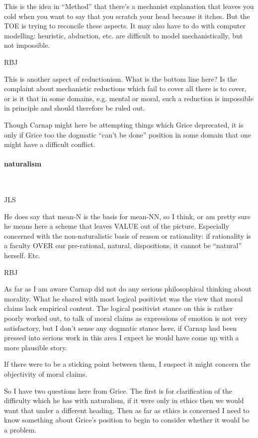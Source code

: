 \documentclass[10pt,titlepage]{book}
\begin{document}
This is the idea in ``Method'' that there's a mechanist  
explanation that leaves you cold when you want to say that you scratch your head  
because it itches. But the TOE is trying to reconcile these aspects. It may 
also  have to do with computer modelling: heuristic, abduction, etc. are 
difficult to  model mechanistically, but not impossible.
 
RBJ

This is another aspect of reductionism.
What is the bottom line here?
Is the complaint about mechanistic reductions which fail to cover all there is to cover, or is it that in some domains, e.g. mental or moral, such a reduction is impossible in principle and should therefore be ruled out.

Though Carnap might here be attempting things which Grice deprecated, it is only if Grice too the dogmatic ``can't be done'' position in some domain that one might have a difficult conflict.
 
\paragraph{naturalism}\ 

JLS

He does say that mean-N is the basis for mean-NN, so I think,  
or am pretty sure he means here a scheme that leaves VALUE out of the 
picture.  Especially concerned with the non-naturalistic basis of reason or 
rationality:  if rationality is a faculty OVER our pre-rational, natural, 
dispositions, it  cannot be ``natural'' herself. Etc. 

RBJ

As far as I am aware Carnap did not do any serious philosophical thinking about morality.
What he shared with most logical positivist was the view that moral claims lack empirical content.
The logical positivist stance on this is rather poorly worked out, to talk of moral claims as expressions of emotion is not very satisfactory, but I don't sense any dogmatic stance here, if Carnap had been pressed into serious work in this area I expect he would have come up with a more plausible story.

If there were to be a sticking point between them, I suspect it might concern the objectivity of moral claims.

So I have two questions here from Grice.
The first is for clarification of the difficulty which he has with naturalism, if it were only in ethics then we would want that under a different heading.
Then as far as ethics is concerned I need to know something about Grice's position to begin to consider whether it would be a problem. 
\end{document}
